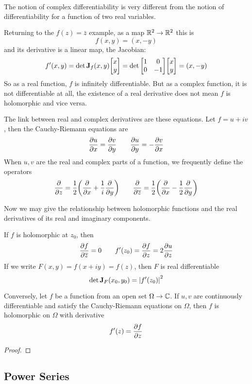 The notion of complex differentiability is very different from the notion of differentiability for a function of two real variables. 

\begin{example}
	Returning to the $f(z) = \bar z$ example, as a map $\mathbb{R}^2 \to \mathbb{R}^2$ this is
	\[ f(x, y) = (x, -y) \]
	and its derivative is a linear map, the Jacobian:
	\[ f'(x, y) = \det \mathbf J_f(x,y) \mqty[x \\ y] = \det \mqty[1 & 0 \\ 0 & -1] \mqty[x \\ y] = (x, -y) \]
	So as a real function, $f$ is infinitely differentiable. But as a complex function, it is not differentiable at all, the existence of a real derivative does not mean $f$ is holomorphic and vice versa.
\end{example}


\begin{definition}
	The link between real and complex derivatives are these equations. Let $f = u + iv$, then the Cauchy-Riemann equations are
	\[ \pdv{u}{x} = \pdv{v}{y} \qquad \pdv{u}{y} = -\pdv{v}{x} \]
	When $u,v$ are the real and complex parts of a function, we frequently define the operators
	\[ \pdv{z} = \frac{1}{2} \qty( \pdv{x} + \frac{1}{i} \pdv{y}) \qquad \pdv{\overline{z}} = \frac{1}{2} \qty( \pdv{x} - \frac{1}{2} \pdv{y}) \]
\end{definition}

Now we may give the relationship between holomorphic functions and the real derivatives of its real and imaginary components.

\begin{theorem}
	If $f$ is holomorphic at $z_0$, then
	\[ \pdv{f}{\overline{z}}(z_0) = 0 \qquad f'(z_0) = \pdv{f}{z}(z_0) = 2\pdv{u}{z}(z_0) \]
	If we write $F(x, y) = f(x + iy) = f(z)$, then $F$ is real differentiable
	\[ \det \mathbf J_F(x_0, y_0) = \abs{f'(z_0)}^2\]
	
	Conversely, let $f$ be a function from an open set $\Omega \to \mathbb{C}$. If $u, v$ are continuously differentiable and satisfy the Cauchy-Riemann equations on $\Omega$, then $f$ is holomorphic on $\Omega$ with derivative
	\[ f'(z) = \pdv{f}{z} \]
\end{theorem}
\begin{proof}
\end{proof}

\subsection{Power Series}

